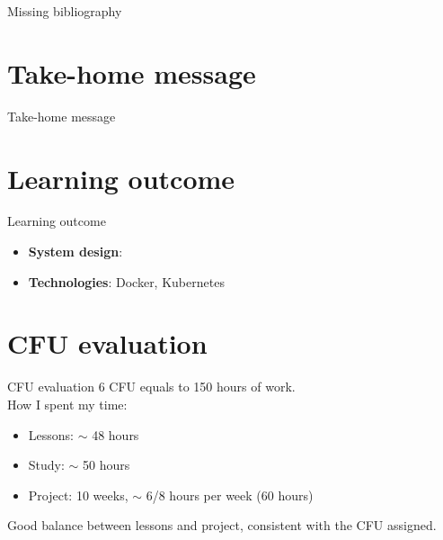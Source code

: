 \documentclass{beamer}
\begin{document}
\begin{frame}{Missing bibliography}

\end{frame}


\section{Take-home message}
\begin{frame}{Take-home message}
\end{frame}
\section{Learning outcome}
\begin{frame}{Learning outcome}
	\begin{itemize}
		\item \textbf{System design}: 
		\item \textbf{Technologies}: Docker, Kubernetes
	\end{itemize}
\end{frame}
\section{CFU evaluation}
\begin{frame}{CFU evaluation}
	6 CFU equals to 150 hours of work.
	\\
	How I spent my time:
	\begin{itemize}
		\item Lessons: $\sim$ 48 hours
		\item Study: $\sim$ 50 hours
		\item Project: 10 weeks, $\sim$ 6/8 hours per week (60 hours)
	\end{itemize}
	\begin{block}{}
		Good balance between lessons and project, consistent with the CFU assigned.
	\end{block}
\end{frame}
\end{document}
